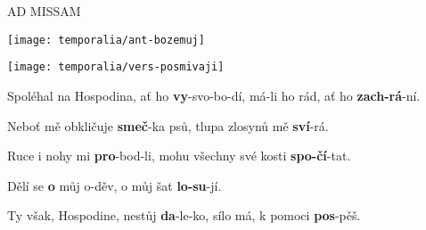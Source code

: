 \documentclass[a4paper, twoside, 12pt]{article}
\begin{document}
\trGloriaLausV


\vfill
\pagebreak


 


\trIngrediente

\vspace{4mm}

\begin{center}
{\large AD MISSAM}
\end{center}


\vfill
\pagebreak


\noindent \texttt{[image: temporalia/ant-bozemuj]}

\noindent \texttt{[image: temporalia/vers-posmivaji]}

 Spoléhal na Hospodina, ať ho \textbf{vy}-svo-bo-dí, \hspace{2.5mm} má-li ho rád, ať ho \hspace{7.5mm} \textbf{zach-rá}-ní.~\Rbardot{}

 Neboť mě obkličuje \hspace{14mm} \textbf{smeč}-ka psů, \hspace{3mm} tlupa zlosynů mě \hspace{10.5mm} \textbf{sví}-rá.

 Ruce i nohy mi \hspace{21mm} \textbf{pro}-bod-li, \hspace{5mm} mohu všechny své kosti \hspace{1mm} \textbf{spo-čí}-tat.~\Rbardot{}

 Dělí se \hspace{34mm} \textbf{o} můj o-děv, \hspace{3mm} o můj šat \hspace{22mm} \textbf{lo-su}-jí.

 Ty však, Hospodine, nestůj \hspace{4mm} \textbf{da}-le-ko, \hspace{8mm} sílo má, k pomoci \hspace{10mm} \textbf{pos}-pěš.~\Rbardot{}
\end{document}
